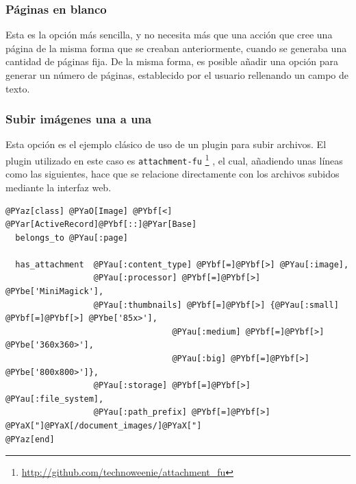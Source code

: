 \subsubsection{Páginas en blanco} %
\label{ssub:paginas_en_blanco}

Esta es la opción más sencilla, y no necesita más que una acción que cree una página de la misma forma que se creaban anteriormente, cuando se generaba una cantidad de páginas fija. De la misma forma, es posible añadir una opción para generar un número de páginas, establecido por el usuario rellenando un campo de texto.


\subsubsection{Subir imágenes una a una} %
\label{ssub:subir_imagenes_una_a_una}

Esta opción es el ejemplo clásico de uso de un plugin para subir archivos. El plugin utilizado en este caso es \texttt{attachment-fu} \footnote{\url{http://github.com/technoweenie/attachment\_fu}} , el cual, añadiendo unas líneas como las siguientes, hace que se relacione directamente con los archivos subidos mediante la interfaz web.

\begin{Verbatim}[commandchars=@\[\]]
@PYaz[class] @PYaO[Image] @PYbf[<] @PYar[ActiveRecord]@PYbf[::]@PYar[Base]
  belongs_to @PYau[:page]
  
  has_attachment  @PYau[:content_type] @PYbf[=]@PYbf[>] @PYau[:image],
                  @PYau[:processor] @PYbf[=]@PYbf[>] @PYbe['MiniMagick'],
                  @PYau[:thumbnails] @PYbf[=]@PYbf[>] {@PYau[:small] @PYbf[=]@PYbf[>] @PYbe['85x>'],
                                  @PYau[:medium] @PYbf[=]@PYbf[>] @PYbe['360x360>'],
                                  @PYau[:big] @PYbf[=]@PYbf[>] @PYbe['800x800>']},
                  @PYau[:storage] @PYbf[=]@PYbf[>] @PYau[:file_system],
                  @PYau[:path_prefix] @PYbf[=]@PYbf[>] @PYaX["]@PYaX[/document_images/]@PYaX["]
@PYaz[end]
\end{Verbatim}

%  

